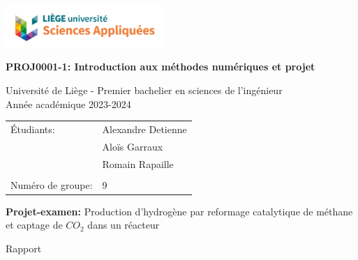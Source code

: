 \documentclass[11pt, a4paper]{report}
\begin{document}
\begin{titlepage}
    \begin{flushleft}
        \includegraphics[width=6cm]{pics/uliege_logo.png}
    \end{flushleft}
    \begin{center}
        \vspace{2cm}

        \LARGE{\textbf{PROJ0001-1: Introduction aux méthodes numériques et projet}}

        \vspace{0.5cm}

        \large{Université de Liège - Premier bachelier en sciences de l'ingénieur\\Année académique 2023-2024}

        \vspace{0.5cm}

        \begin{tabular}{l l}
            Étudiants: & Alexandre Detienne\\ & Aloïs Garraux\\ & Romain Rapaille\\
            \\
            Numéro de groupe: & 9\\
        \end{tabular}

        \vspace{2cm}

        \LARGE{\textbf{Projet-examen:} Production d'hydrogène par reformage catalytique de méthane et captage de $CO_2$ dans un réacteur}

        \vspace{1cm}

        Rapport
    \end{center}
\end{titlepage}
\end{document}

